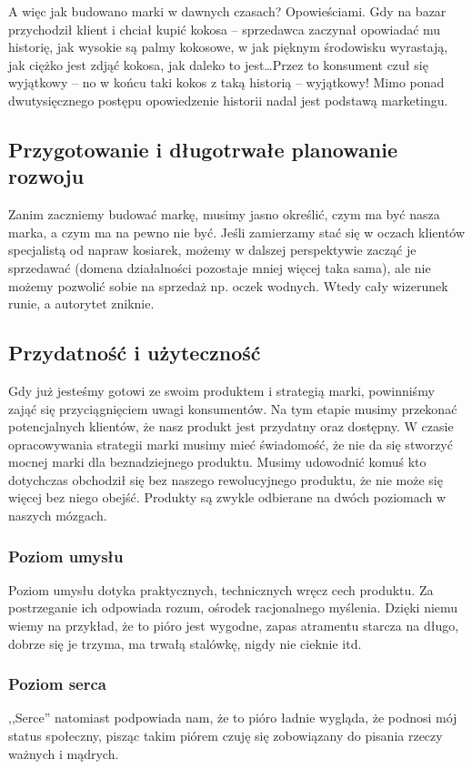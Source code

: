 \documentclass [a4paper, 11pt]{article}
\begin{document}
A więc jak budowano marki w dawnych czasach? Opowieściami. \cite{wyklad2} Gdy na bazar przychodził klient i chciał kupić kokosa -- sprzedawca zaczynał opowiadać mu historię, jak wysokie są palmy kokosowe, w jak pięknym środowisku wyrastają, jak ciężko jest zdjąć kokosa, jak daleko to jest\dots Przez to konsument czuł się wyjątkowy -- no w końcu taki kokos z taką historią -- wyjątkowy! Mimo ponad dwutysięcznego postępu opowiedzenie historii nadal jest podstawą marketingu.

\subsection{Przygotowanie i długotrwałe planowanie rozwoju}
Zanim zaczniemy budować markę, musimy jasno określić, czym ma być nasza marka, a czym ma na pewno nie być. \cite[s.~18]{tkaczykzakamarki} Jeśli zamierzamy stać się w oczach klientów specjalistą od napraw kosiarek, możemy w dalszej perspektywie zacząć je sprzedawać (domena działalności pozostaje mniej więcej taka sama), ale nie możemy pozwolić sobie na sprzedaż np. oczek wodnych. Wtedy cały wizerunek runie, a autorytet zniknie. \cite{wyklad2}
\subsection{Przydatność i użyteczność}
Gdy już jesteśmy gotowi ze swoim produktem i strategią marki, powinniśmy zająć się przyciągnięciem uwagi konsumentów. \cite{kall, tkaczykzakamarki} Na tym etapie musimy przekonać potencjalnych klientów, że nasz produkt jest przydatny oraz dostępny. W czasie opracowywania strategii marki musimy mieć świadomość, że nie da się stworzyć mocnej marki dla beznadziejnego produktu. Musimy udowodnić komuś kto dotychczas obchodził się bez naszego rewolucyjnego produktu, że nie może się więcej bez niego obejść. \cite[s.~109]{pogorzelski} Produkty są zwykle odbierane na dwóch poziomach w naszych mózgach.
\subsubsection{Poziom umysłu}
Poziom umysłu dotyka praktycznych, technicznych wręcz cech produktu. Za postrzeganie ich odpowiada rozum, ośrodek racjonalnego myślenia. Dzięki niemu wiemy na przykład, że to pióro jest wygodne, zapas atramentu starcza na długo, dobrze się je trzyma, ma trwałą stalówkę, nigdy nie cieknie itd.
\subsubsection{Poziom serca}
,,Serce'' natomiast podpowiada nam, że to pióro ładnie wygląda, że podnosi mój status społeczny, pisząc takim piórem czuję się zobowiązany do pisania rzeczy ważnych i mądrych.
\end{document}
